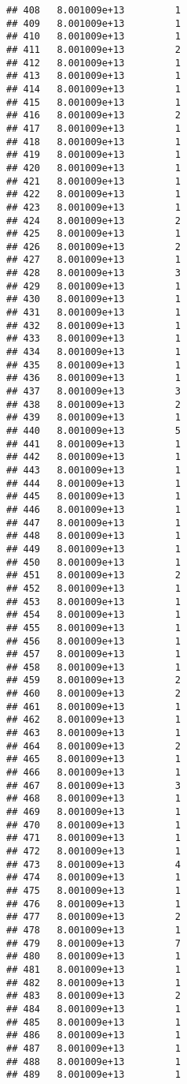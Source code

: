 \documentclass[
]{article}
\begin{document}
\begin{verbatim}
## 408   8.001009e+13         1
## 409   8.001009e+13         1
## 410   8.001009e+13         1
## 411   8.001009e+13         2
## 412   8.001009e+13         1
## 413   8.001009e+13         1
## 414   8.001009e+13         1
## 415   8.001009e+13         1
## 416   8.001009e+13         2
## 417   8.001009e+13         1
## 418   8.001009e+13         1
## 419   8.001009e+13         1
## 420   8.001009e+13         1
## 421   8.001009e+13         1
## 422   8.001009e+13         1
## 423   8.001009e+13         1
## 424   8.001009e+13         2
## 425   8.001009e+13         1
## 426   8.001009e+13         2
## 427   8.001009e+13         1
## 428   8.001009e+13         3
## 429   8.001009e+13         1
## 430   8.001009e+13         1
## 431   8.001009e+13         1
## 432   8.001009e+13         1
## 433   8.001009e+13         1
## 434   8.001009e+13         1
## 435   8.001009e+13         1
## 436   8.001009e+13         1
## 437   8.001009e+13         3
## 438   8.001009e+13         2
## 439   8.001009e+13         1
## 440   8.001009e+13         5
## 441   8.001009e+13         1
## 442   8.001009e+13         1
## 443   8.001009e+13         1
## 444   8.001009e+13         1
## 445   8.001009e+13         1
## 446   8.001009e+13         1
## 447   8.001009e+13         1
## 448   8.001009e+13         1
## 449   8.001009e+13         1
## 450   8.001009e+13         1
## 451   8.001009e+13         2
## 452   8.001009e+13         1
## 453   8.001009e+13         1
## 454   8.001009e+13         1
## 455   8.001009e+13         1
## 456   8.001009e+13         1
## 457   8.001009e+13         1
## 458   8.001009e+13         1
## 459   8.001009e+13         2
## 460   8.001009e+13         2
## 461   8.001009e+13         1
## 462   8.001009e+13         1
## 463   8.001009e+13         1
## 464   8.001009e+13         2
## 465   8.001009e+13         1
## 466   8.001009e+13         1
## 467   8.001009e+13         3
## 468   8.001009e+13         1
## 469   8.001009e+13         1
## 470   8.001009e+13         1
## 471   8.001009e+13         1
## 472   8.001009e+13         1
## 473   8.001009e+13         4
## 474   8.001009e+13         1
## 475   8.001009e+13         1
## 476   8.001009e+13         1
## 477   8.001009e+13         2
## 478   8.001009e+13         1
## 479   8.001009e+13         7
## 480   8.001009e+13         1
## 481   8.001009e+13         1
## 482   8.001009e+13         1
## 483   8.001009e+13         2
## 484   8.001009e+13         1
## 485   8.001009e+13         1
## 486   8.001009e+13         1
## 487   8.001009e+13         1
## 488   8.001009e+13         1
## 489   8.001009e+13         1

\end{verbatim}
\end{document}
